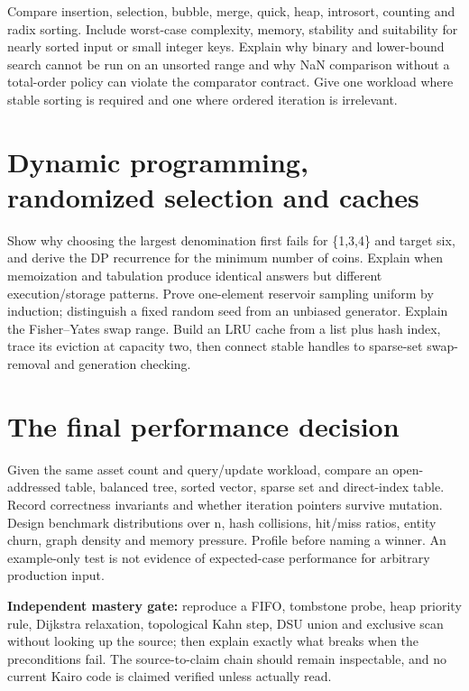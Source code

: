 Compare insertion, selection, bubble, merge, quick, heap, introsort, counting and radix sorting. Include worst-case complexity, memory, stability and suitability for nearly sorted input or small integer keys. Explain why binary and lower-bound search cannot be run on an unsorted range and why NaN comparison without a total-order policy can violate the comparator contract. Give one workload where stable sorting is required and one where ordered iteration is irrelevant.

\section{Dynamic programming, randomized selection and caches}\label{appendix-8a046b38375e-dynamic-programming-randomized-selection-and-caches}

Show why choosing the largest denomination first fails for \{1,3,4\} and target six, and derive the DP recurrence for the minimum number of coins. Explain when memoization and tabulation produce identical answers but different execution/storage patterns. Prove one-element reservoir sampling uniform by induction; distinguish a fixed random seed from an unbiased generator. Explain the Fisher--Yates swap range. Build an LRU cache from a list plus hash index, trace its eviction at capacity two, then connect stable handles to sparse-set swap-removal and generation checking.

\section{The final performance decision}\label{appendix-8a046b38375e-the-final-performance-decision}

Given the same asset count and query/update workload, compare an open-addressed table, balanced tree, sorted vector, sparse set and direct-index table. Record correctness invariants and whether iteration pointers survive mutation. Design benchmark distributions over n, hash collisions, hit/miss ratios, entity churn, graph density and memory pressure. Profile before naming a winner. An example-only test is not evidence of expected-case performance for arbitrary production input.

\textbf{Independent mastery gate:} reproduce a FIFO, tombstone probe, heap priority rule, Dijkstra relaxation, topological Kahn step, DSU union and exclusive scan without looking up the source; then explain exactly what breaks when the preconditions fail. The source-to-claim chain should remain inspectable, and no current Kairo code is claimed verified unless actually read.

